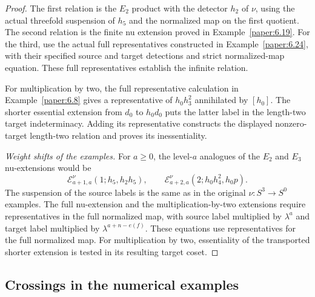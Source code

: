 \begin{proof}
The first relation is the $E_2$ product with the detector $h_2$ of $\nu$, using the actual threefold suspension of $h_5$ and the normalized map on the first quotient. The second relation is the finite nu extension proved in Example~\ref{paper:6.19}. For the third, use the actual full representatives constructed in Example~\ref{paper:6.24}, with their specified source and target detections and strict normalized-map equation. These full representatives establish the infinite relation.

For multiplication by two, the full representative calculation in Example~\ref{paper:6.8} gives a representative of $h_0h_3^2$ annihilated by $[h_0]$. The shorter essential extension from $d_0$ to $h_0d_0$ puts the latter label in the length-two target indeterminacy. Adding its representative constructs the displayed nonzero-target length-two relation and proves its inessentiality.

\textit{Weight shifts of the examples.}
For $a\geq0$, the level-$a$ analogues of the $E_2$ and $E_3$
nu-extensions would be
\[
\mathcal E^\nu_{a+1,a}(1;h_5,h_2h_5),\qquad
\mathcal E^\nu_{a+2,a}(2;h_0h_4^2,h_0p).
\]
The suspension of the source labels is the same as in the original
$\nu:S^3\to S^0$ examples. The full nu-extension and the
multiplication-by-two extensions require representatives in the full
normalized map, with
source label multiplied by $\lambda^a$ and target label multiplied
by $\lambda^{a+n-e(f)}$. These equations use representatives for the full normalized map. For multiplication by two, essentiality of the transported shorter
extension is tested in its resulting target coset.
\end{proof}

\subsection{Crossings in the numerical examples}

